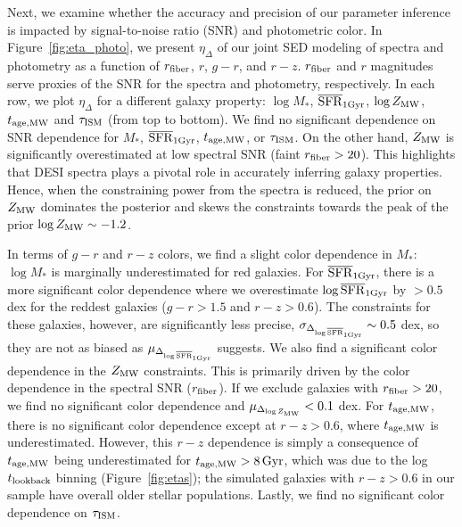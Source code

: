 Next, we examine whether the accuracy and precision of our parameter inference
is impacted by signal-to-noise ratio (SNR) and photometric color. 
In Figure~\ref{fig:eta_photo}, we present $\eta_\Delta$ of our joint
SED modeling of spectra and photometry as a function of $r_{\rm fiber}$, $r$,
$g-r$, and $r-z$. 
$r_{\rm fiber}$ and $r$ magnitudes serve proxies of the SNR for the spectra and
photometry, respectively. 
In each row, we plot $\eta_\Delta$ for a different galaxy property: $\log M_*$,
$\overline{\rm SFR}_{\rm 1Gyr}$, $\log Z_{\rm MW}$, $t_{\rm age, MW}$ and $\tau_{\rm ISM}$ (from top to bottom).
We find no significant dependence on SNR dependence for $M_*$, $\overline{\rm SFR}_{\rm 1Gyr}$,
$t_{\rm age, MW}$, or $\tau_{\rm ISM}$. 
On the other hand, $Z_{\rm MW}$ is significantly overestimated at low spectral
SNR (faint $r_{\rm fiber} > 20$). 
This highlights that DESI spectra plays a pivotal role in accurately inferring
galaxy properties. 
Hence, when the constraining power from the spectra is reduced, the prior on 
$Z_{\rm MW}$ dominates the posterior and skews the constraints towards the peak
of the prior $\log Z_{\rm MW}\sim-1.2$. 

In terms of $g-r$ and $r-z$ colors, we find a slight color dependence in $M_*$:
$\log M_*$ is marginally underestimated for red galaxies. 
For $\overline{\rm SFR}_{\rm 1Gyr}$, there is a more significant color dependence where we
overestimate $\log\overline{\rm SFR}_{\rm 1Gyr}$ by $>0.5$ dex for the reddest galaxies 
($g-r > 1.5$ and $r-z> 0.6$).
The constraints for these galaxies, however, are significantly less precise,
$\sigma_{\Delta_{\log\overline{\rm SFR}_{\rm 1Gyr}}} \sim 0.5$ dex, so they are not as biased as
$\mu_{\Delta_{\log\overline{\rm SFR}_{\rm 1Gyr}}}$ suggests.
We also find a significant color dependence in the $Z_{\rm MW}$ constraints.
This is primarily driven by the color dependence in the spectral SNR ($r_{\rm
fiber}$).  
If we exclude galaxies with $r_{\rm fiber} > 20$, we find no significant color
dependence and $\mu_{\Delta_{\log Z_{\rm MW}}} < 0.1$ dex.
For $t_{\rm age, MW}$, there is no significant color dependence except at $r - z > 0.6$,
where $t_{\rm age, MW}$ is underestimated. 
However, this $r - z$ dependence is simply a consequence of $t_{\rm age, MW}$ being
underestimated for $t_{\rm age, MW} > 8\,{\rm Gyr}$, which was due to the log $t_{\rm lookback}$
binning (Figure~\ref{fig:etas}); the simulated galaxies with $r - z > 0.6$ in
our sample have overall older stellar populations.
Lastly, we find no significant color dependence on $\tau_{\rm ISM}$. 


